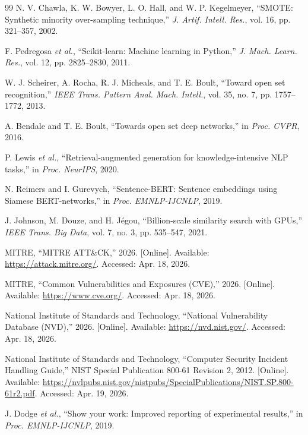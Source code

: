 \documentclass[conference]{IEEEtran}
\begin{document}
\begin{thebibliography}{99}
N. V. Chawla, K. W. Bowyer, L. O. Hall, and W. P. Kegelmeyer, ``SMOTE: Synthetic minority over-sampling technique,'' \emph{J. Artif. Intell. Res.}, vol. 16, pp. 321--357, 2002.

F. Pedregosa \emph{et al.}, ``Scikit-learn: Machine learning in Python,'' \emph{J. Mach. Learn. Res.}, vol. 12, pp. 2825--2830, 2011.

W. J. Scheirer, A. Rocha, R. J. Micheals, and T. E. Boult, ``Toward open set recognition,'' \emph{IEEE Trans. Pattern Anal. Mach. Intell.}, vol. 35, no. 7, pp. 1757--1772, 2013.

A. Bendale and T. E. Boult, ``Towards open set deep networks,'' in \emph{Proc. CVPR}, 2016.

P. Lewis \emph{et al.}, ``Retrieval-augmented generation for knowledge-intensive NLP tasks,'' in \emph{Proc. NeurIPS}, 2020.

N. Reimers and I. Gurevych, ``Sentence-BERT: Sentence embeddings using Siamese BERT-networks,'' in \emph{Proc. EMNLP-IJCNLP}, 2019.

J. Johnson, M. Douze, and H. J\'egou, ``Billion-scale similarity search with GPUs,'' \emph{IEEE Trans. Big Data}, vol. 7, no. 3, pp. 535--547, 2021.

MITRE, ``MITRE ATT\&CK,'' 2026. [Online]. Available: \url{https://attack.mitre.org/}. Accessed: Apr. 18, 2026.

MITRE, ``Common Vulnerabilities and Exposures (CVE),'' 2026. [Online]. Available: \url{https://www.cve.org/}. Accessed: Apr. 18, 2026.

National Institute of Standards and Technology, ``National Vulnerability Database (NVD),'' 2026. [Online]. Available: \url{https://nvd.nist.gov/}. Accessed: Apr. 18, 2026.

National Institute of Standards and Technology, ``Computer Security Incident Handling Guide,'' NIST Special Publication 800-61 Revision 2, 2012. [Online]. Available: \url{https://nvlpubs.nist.gov/nistpubs/SpecialPublications/NIST.SP.800-61r2.pdf}. Accessed: Apr. 19, 2026.

J. Dodge \emph{et al.}, ``Show your work: Improved reporting of experimental results,'' in \emph{Proc. EMNLP-IJCNLP}, 2019.


\end{thebibliography}
\end{document}
